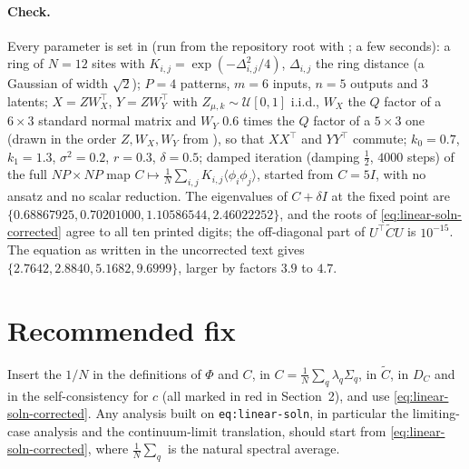 \documentclass[11pt,a4paper]{article}
\begin{document}
\paragraph{Check.}
Every parameter is set in  (run from the repository root with ; a few seconds):
a ring of $N=12$ sites with $K_{i,j} = \exp(-\Delta_{i,j}^2/4)$, $\Delta_{i,j}$ the ring distance (a Gaussian of width $\sqrt2$);
$P=4$ patterns, $m=6$ inputs, $n=5$ outputs and $3$ latents;
$X = ZW_X^\top$, $Y = ZW_Y^\top$ with $Z_{\mu,k}\sim\mathcal U[0,1]$ i.i.d., $W_X$ the $Q$ factor of a $6\times3$ standard normal matrix and $W_Y$ $0.6$ times the $Q$ factor of a $5\times3$ one (drawn in the order $Z, W_X, W_Y$ from ), so that $XX^\top$ and $YY^\top$ commute;
$k_0 = 0.7$, $k_1 = 1.3$, $\sigma^2 = 0.2$, $r = 0.3$, $\delta = 0.5$;
damped iteration (damping $\tfrac12$, $4000$ steps) of the full $NP\times NP$ map $C \mapsto \frac1N\sum_{i,j}K_{i,j}\langle\phi_i\phi_j\rangle$, started from $C = 5I$, with no ansatz and no scalar reduction.
The eigenvalues of $C+\delta I$ at the fixed point are $\{0.68867925, 0.70201000, 1.10586544, 2.46022252\}$, and the roots of \eqref{eq:linear-soln-corrected} agree to all ten printed digits; the off-diagonal part of $U^\top\tilde C U$ is $10^{-15}$.
The equation as written in the uncorrected text gives $\{2.7642, 2.8840, 5.1682, 9.6999\}$, larger by factors $3.9$ to $4.7$.

\section{Recommended fix}
Insert the $1/N$ in the definitions of $\Phi$ and $C$, in $C = \frac1N\sum_q\lambda_q\Sigma_q$, in $\tilde C$, in $D_C$ and in the self-consistency for $c$ (all marked in red in Section~2), and use \eqref{eq:linear-soln-corrected}.
Any analysis built on \texttt{eq:linear-soln}, in particular the limiting-case analysis and the continuum-limit translation, should start from \eqref{eq:linear-soln-corrected}, where $\frac1N\sum_q$ is the natural spectral average.
\end{document}
